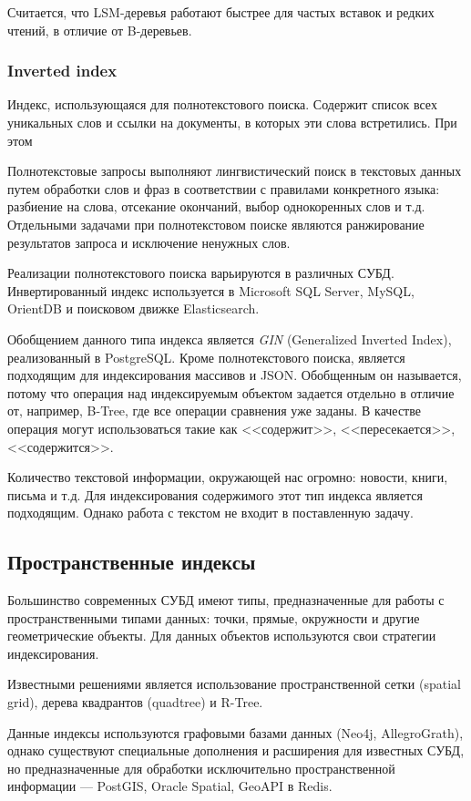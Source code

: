 Считается, что LSM-деревья работают быстрее для частых вставок и редких чтений, в отличие от B-деревьев.

\subsubsection{Inverted index}
Индекс, использующаяся для полнотекстового поиска. Содержит список всех уникальных слов и ссылки на документы, в которых эти слова встретились. При этом 

Полнотекстовые запросы выполняют лингвистический поиск в текстовых данных путем обработки слов и фраз в соответствии с правилами конкретного языка: разбиение на слова, отсекание окончаний, выбор однокоренных слов и т.д. Отдельными задачами при полнотекстовом поиске являются ранжирование результатов запроса и исключение ненужных слов.

Реализации полнотекстового поиска варьируются в различных СУБД. Инвертированный индекс используется в Microsoft SQL Server, MySQL, OrientDB и поисковом движке Elasticsearch.

Обобщением данного типа индекса является \textit{GIN} (Generalized Inverted Index),  реализованный в PostgreSQL.
Кроме полнотекстового поиска, является подходящим для индексирования массивов и JSON. Обобщенным он называется, потому что операция над индексируемым объектом задается отдельно в отличие от, например, B-Tree, где все операции сравнения уже заданы. В качестве операция могут использоваться такие как <<содержит>>, <<пересекается>>, <<содержится>>.

Количество текстовой информации, окружающей нас огромно: новости, книги, письма и т.д. Для индексирования содержимого этот тип индекса является подходящим. Однако работа с текстом не входит в поставленную задачу. 

\subsection{Пространственные индексы}
Большинство современных СУБД имеют типы, предназначенные для работы с пространственными типами данных: точки, прямые, окружности и другие геометрические объекты. Для данных объектов используются свои стратегии индексирования.

Известными решениями является использование пространственной сетки (spatial grid), дерева квадрантов (quadtree) и R-Tree.

Данные индексы используются графовыми базами данных (Neo4j, AllegroGrath), однако существуют специальные дополнения и расширения для известных СУБД, но предназначенные для обработки исключительно пространственной информации --- PostGIS, Oracle Spatial, GeoAPI в Redis.

